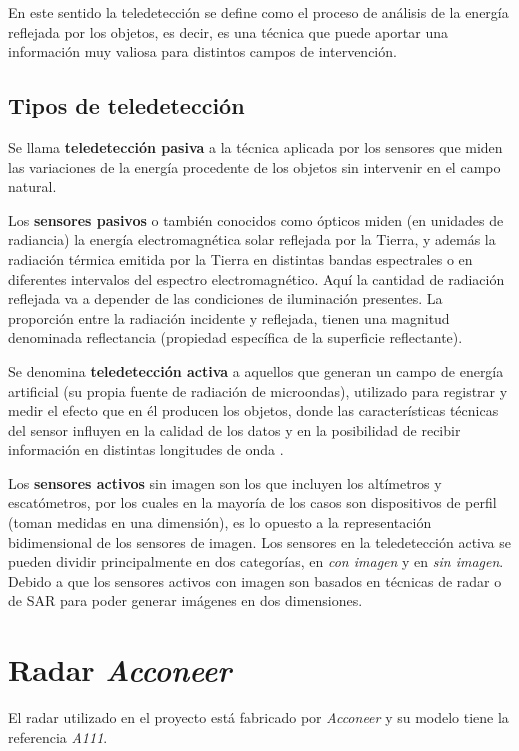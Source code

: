 En este sentido la teledetección se define como el proceso de análisis de la energía reflejada por los objetos, es decir, es una técnica que puede aportar una información muy valiosa para distintos campos de intervención. 

\subsection{Tipos de teledetección}

Se llama \textbf{teledetección pasiva} a la técnica aplicada por los sensores que miden las variaciones de la energía procedente de los objetos sin intervenir en el campo natural. 

Los \textbf{sensores pasivos} o también conocidos como ópticos miden (en unidades de radiancia) la energía electromagnética solar reflejada por la Tierra, y además la radiación térmica emitida por la Tierra en distintas bandas espectrales o en diferentes intervalos del espectro electromagnético. Aquí la cantidad de radiación reflejada va a depender de las condiciones de iluminación presentes. La proporción entre la radiación incidente y reflejada, tienen una magnitud denominada reflectancia (propiedad específica de la superficie reflectante).

Se denomina \textbf{teledetección activa} a aquellos que generan un campo de energía artificial (su propia fuente de radiación de microondas), utilizado para registrar y medir el efecto que en él producen los objetos, donde las características técnicas del sensor influyen en la calidad de los datos y  en la posibilidad de recibir información en distintas longitudes de onda \cite{AcevoHerrera2011Apr}. 

Los \textbf{sensores activos} sin imagen son los que incluyen los altímetros y escatómetros, por los cuales en la mayoría de los casos son dispositivos de perfil (toman medidas en una dimensión), es lo opuesto a la representación bidimensional de los sensores de imagen. Los sensores en la teledetección activa se pueden dividir principalmente en dos categorías, en \textit{con imagen} y en \textit{sin imagen}. Debido a que los sensores activos con imagen son basados en técnicas de radar o de SAR para poder generar imágenes en dos dimensiones.

\section{Radar \textit{Acconeer}}

El radar utilizado en el proyecto está fabricado por \textit{Acconeer} y su modelo tiene la referencia \textit{A111}. 

